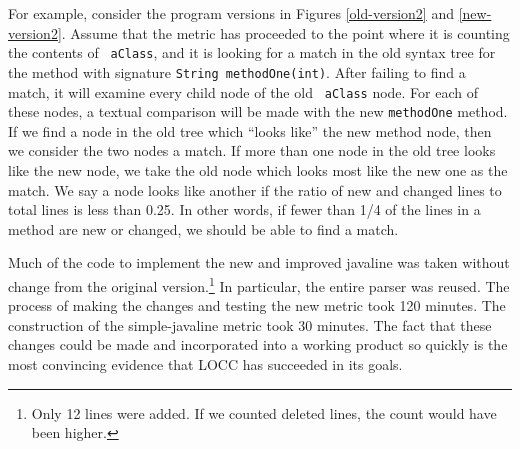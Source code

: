 For example, consider the program versions in Figures
\ref{old-version2} and \ref{new-version2}.  Assume that the metric has 
proceeded to the point where it is counting the contents of {\tt
  aClass}, and it is looking for a match in the old syntax tree for
the method with signature {\tt String methodOne(int)}.  After failing
to find a match, it will examine every child node of the old {\tt
  aClass} node.  For each of these nodes, a textual comparison will be 
made with the new {\tt methodOne} method.  If we find a node in the
old tree which ``looks like'' the new method node, then we consider
the two nodes a match.  If more than one node in the old tree looks
like the new node, we take the old node which looks most like the new
one as the match.  We say a node looks like another if the ratio of
new and changed lines to total lines is less than 0.25.  In other
words, if fewer than 1/4 of the lines in a method are new or changed,
we should be able to find a match.

Much of the code to implement the new and improved {\sc javaline} was
taken without change from the original version.\footnote{Only 12 lines were 
  added.  If we counted deleted lines, the count would have been higher.}
In particular, the entire parser was reused.  The process of
making the changes and testing the new metric took 120 minutes.  The
construction of the {\sc simple-javaline} metric took 30 minutes.  The 
fact that these changes could be made and incorporated into a working
product so quickly is the most convincing evidence that LOCC has
succeeded in its goals.






